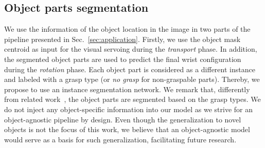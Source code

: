 \subsection{Object parts segmentation}
\label{sec:object_parts_segmentation}
We use the information of the object location in the image in two parts of the pipeline presented in Sec.~\ref{sec:application}. Firstly, we use the object mask centroid as input for the visual servoing during the \textit{transport} phase. In addition, the segmented object parts are used to predict the final wrist configuration during the \textit{rotation} phase.
Each object part is considered as a different instance and labeled with a grasp type (or \textit{no grasp} for non-graspable parts). Thereby, we propose to use an instance segmentation network. We remark that, differently from related work~\cite{starke2022}, the object parts are segmented based on the grasp types. We do not inject any object-specific information into our model as we strive for an object-agnostic pipeline by design. Even though the generalization to novel objects is not the focus of this work, we believe that an object-agnostic model would serve as a basis for such generalization, facilitating future research. 

